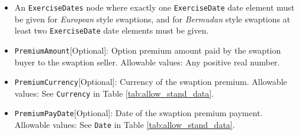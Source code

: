 \begin{itemize}
\item An \lstinline!ExerciseDates! node where exactly one \lstinline!ExerciseDate! date element must be given for \emph{European} style swaptions, and for \emph{Bermudan} style swaptions  at least two \lstinline!ExerciseDate! date elements must be given. \\

\item \lstinline!PremiumAmount![Optional]: Option premium amount paid by the swaption buyer to the swaption seller. Allowable values:  Any positive real number.

\item \lstinline!PremiumCurrency![Optional]: Currency of the swaption premium. Allowable values:  See \lstinline!Currency! in Table \ref{tab:allow_stand_data}.

\item \lstinline!PremiumPayDate![Optional]: Date of the swaption premium payment. Allowable values:  See \lstinline!Date! in Table \ref{tab:allow_stand_data}.


\end{itemize}



